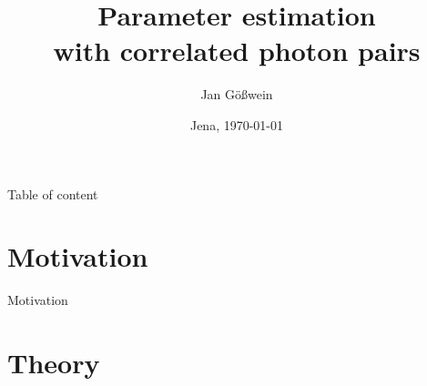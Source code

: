 \documentclass[10pt,aspectratio=43]{beamer}
\title[Parameter estimation]{Parameter estimation\\with correlated photon pairs}
\author[Jan Gößwein]{Jan Gößwein}
\date{Jena, \today}
\institute[IAP]{Institute of Applied Physics}
\begin{document}
	
	\showheadlinefalse
	\begin{frame}[noframenumbering]
		\titlepage
	\end{frame}
	
	
	
	
	\showheadlinefalse
	\begin{frame}{Table of content}
		\tableofcontents
	\end{frame}
	
	\showheadlinetrue
	
	\section{Motivation}
	\begin{frame}{Motivation}
	\end{frame}
	
	\section{Theory}
	
\end{document}
